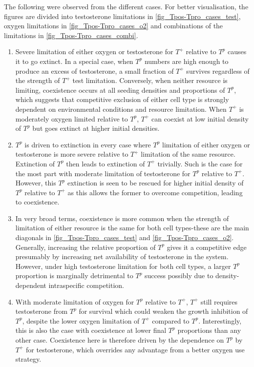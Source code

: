\newpage

The following were observed from the different cases. For better visualisation, the figures are divided into testosterone limitations in \autoref{fig_Tpos-Tpro_cases_test}, oxygen limitations in \autoref{fig_Tpos-Tpro_cases_o2} and combinations of the limitations in \autoref{fig_Tpos-Tpro_cases_combi}.
\begin{enumerate}
  \item Severe limitation of either oxygen or testosterone for $T^+$ relative to $T^p$ causes it to go extinct. In a special case, when $T^p$ numbers are high enough to produce an excess of testosterone, a small fraction of $T^+$ survives regardless of the strength of $T^+$ test limitation. Conversely, when neither resource is limiting, coexistence occurs at all seeding densities and proportions of $T^p$, which suggests that competitive exclusion of either cell type is strongly dependent on environmental conditions and resource limitation. When $T^+$ is moderately oxygen limited relative to $T^p$, $T^+$ can coexist at low initial density of $T^p$ but goes extinct at higher initial densities.
  \item $T^p$ is driven to extinction in every case where $T^p$ limitation of either oxygen or testosterone is more severe relative to $T^+$ limitation of the same resource. Extinction of $T^p$ then leads to extinction of $T^+$ trivially. Such is the case for the most part with moderate limitation of testosterone for $T^p$ relative to $T^+$. However, this $T^p$ extinction is seen to be rescued for higher initial density of $T^p$ relative to $T^+$ as this allows the former to overcome competition, leading to coexistence.
  \item In very broad terms, coexistence is more common when the strength of limitation of either resource is the same for both cell types-these are the main diagonals in \autoref{fig_Tpos-Tpro_cases_test} and \autoref{fig_Tpos-Tpro_cases_o2}. Generally, increasing the relative proportion of $T^p$ gives it a competitive edge presumably by increasing net availability of testosterone in the system. However, under high testosterone limitation for both cell types, a larger $T^p$ proportion is marginally detrimental to $T^p$ success possibly due to density-dependent intraspecific competition.
  \item With moderate limitation of oxygen for $T^p$ relative to $T^+$, $T^+$ still requires testosterone from $T^p$ for survival which could weaken the growth inhibition of $T^p$, despite the lower oxygen limitation of $T^+$ compared to $T^p$. Interestingly, this is also the case with coexistence at lower final $T^p$ proportions than any other case. Coexistence here is therefore driven by the dependence on $T^p$ by $T^+$ for testosterone, which overrides any advantage from a better oxygen use strategy.

\end{enumerate}
